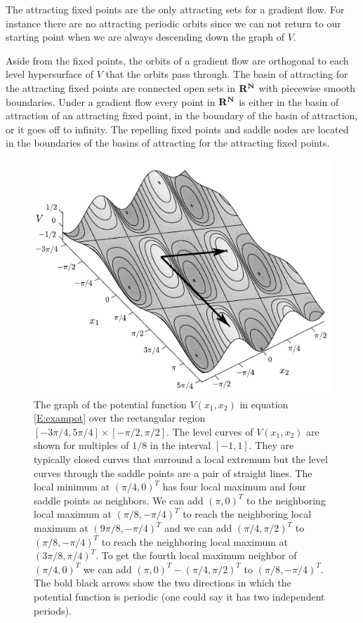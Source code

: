    The attracting fixed points are the only attracting sets for a gradient 
flow.  For instance there are no attracting periodic orbits since we can not 
return to our starting point when we are always descending down the graph of 
$V$.  

   Aside from the fixed points, the orbits of a gradient flow are orthogonal to
each level hypersurface of $V$ that the orbits pass through.  The basin of 
attracting for the attracting fixed points are connected open sets in $\bf{R}^N$ 
with piecewise smooth boundaries.  Under a gradient flow every point in 
$\bf{R}^N$ is either in the basin of attraction of an attracting fixed point, in
the boundary of the basin of attraction, or it goes off to infinity.  The 
repelling fixed points and saddle nodes are located in the boundaries of the 
basins of attracting for the attracting fixed points.  

\begin{figure}[ht]
\centering
\includegraphics[scale=1.20]{./images/Gradient1.pdf}
\caption{The graph of the potential function $V( x_1, x_2)$ in equation 
\eqref{E:exampot} over the rectangular region $[-3\pi/4,5\pi/4] \times 
[-\pi/2,\pi/2]$.  The level curves of $V( x_1, x_2)$ are shown for 
multiples of $1/8$ in the interval $[-1,1]$.  They are typically closed 
curves that surround a local extremum but the level curves through the saddle 
points are a pair of straight lines.  The local minimum at $(\pi/4,0)^T$ has 
four local maximum and four saddle points as neighbors.  We can add $(\pi,0)^T$
to the neighboring local maximum at $(\pi/8,-\pi/4)^T$ to reach the neighboring
local maximum at $(9\pi/8,-\pi/4)^T$ and we can add $(\pi/4,\pi/2)^T$ to 
$(\pi/8,-\pi/4)^T$ to reach the neighboring local maximum at 
$(3\pi/8,\pi/4)^T$.  To get the fourth local maximum neighbor of 
$(\pi/4,0)^T$ we can add $(\pi,0)^T - (\pi/4,\pi/2)^T$ to $(\pi/8,-\pi/4)^T$. The bold black arrows show the two directions in which the potential function is periodic (one could say it has two independent periods).}
\label{F:exampot}  
\end{figure}


